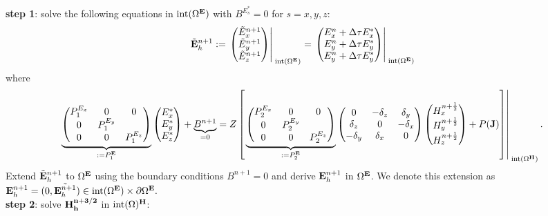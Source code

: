 \documentclass[12pt,reqno]{amsart}
\newcommand{\e}{{\bf E}}
\newcommand{\h}{{\bf H}}
\theoremstyle{definition}
\numberwithin{equation}{section}
\newcommand{\intr}[1]{\mathrm{int}(#1)}
\def\Gw{\Omega}     \def\Gx{\Xi}         \def\Gy{\Psi}
\begin{document}
	{\bf step 1}: solve the following equations in $\intr{\Gw^{\e}}$ with
	 $B^{E_s^*}=0$ for $s=x,y,z$: \\[2mm]
	$$
	\tilde{\e}_h^{n+1}:=
	\left.
	\begin{pmatrix}
		\tilde{E}_x^{n+1}\\
		\tilde{E}_y^{n+1}\\
		\tilde{E}_z^{n+1}
	\end{pmatrix}\right|_{\; \intr{\Gw^{\e}}}^{\;}=
\left.
	\begin{pmatrix}
		E_x^n+\Delta \tau E_x^{*}\\
		E_y^n+\Delta \tau E_y^{*}\\
		E_y^n+\Delta \tau E_y^{*}
	\end{pmatrix}\right|_{\; \intr{\Gw^{\e}}}^{\;}
	$$
	where 
	$$
	\underbrace{
	\begin{pmatrix}
		P_1^{E_x} & 0&0 \\
		0 & P_1^{E_y} &\\
		0&0&P_1^{E_z} 
	\end{pmatrix}
}_{:=P_1^\e}
	\begin{pmatrix}
		E_x^{*}\\
		E_y^{*} \\
		E_z^{*}
	\end{pmatrix}+\underbrace{B^{n+1}}_{=0}=Z
\left [ \left.
	\underbrace{
	\begin{pmatrix}
		P_2^{E_x} & 0&0 \\
		0 & P_2^{E_y} &\\
		0&0&P_2^{E_z} 
	\end{pmatrix}
}_{:=P_2^\e}
	\begin{pmatrix}
		0& -\delta_z & \delta _y\\
		\delta_z&0&-\delta_x\\
		-\delta_y&\delta_x&0
	\end{pmatrix}
	\begin{pmatrix}
		H_x^{n+\frac{1}{2}}\\
		H_y^{n+\frac{1}{2}}\\
		H_z^{n+\frac{1}{2}}
	\end{pmatrix}+P({\bf J})\right]\right|_{\; \intr{\Gw^{\h}}}^{\;}.
	$$
	Extend $\tilde{\e}_h^{n+1}$
to $\Gw^\e$ using the boundary conditions $B^{n+1}=0$ and derive 
$\e_h^{n+1}$ in $\Gw^\e$. 
We denote this extension as $\e_h^{n+1}=(0,\tilde{\e_h^{n+1}})\in 
\intr{\Gw^\e}\times \partial \Gw^{\e}.
$ 
	\\[1mm]
	{\bf step 2}: solve $\bf{H}^{n+3/2}_h$ in $\intr\Gw^\h$: \\[2mm]
\end{document}
